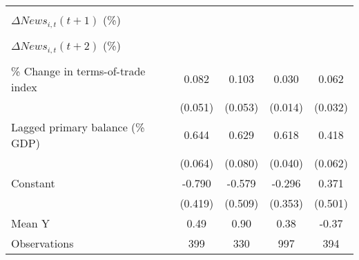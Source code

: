 {\begin{tabular}{l*{4}{c}}
                    &                     &                     &                     &                     \\
\addlinespace
$ \Delta News_{i,t}(t+1)$ (\%)&                     &                     &                     &                     \\
                    &                     &                     &                     &                     \\
\addlinespace
$ \Delta News_{i,t}(t+2)$ (\%)&                     &                     &                     &                     \\
                    &                     &                     &                     &                     \\
\addlinespace
\% Change in terms-of-trade index&       0.082         &       0.103\sym{*}  &       0.030\sym{**} &       0.062\sym{*}  \\
                    &     (0.051)         &     (0.053)         &     (0.014)         &     (0.032)         \\
\addlinespace
Lagged primary balance (\% GDP)&       0.644\sym{***}&       0.629\sym{***}&       0.618\sym{***}&       0.418\sym{***}\\
                    &     (0.064)         &     (0.080)         &     (0.040)         &     (0.062)         \\
\addlinespace
Constant            &      -0.790\sym{*}  &      -0.579         &      -0.296         &       0.371         \\
                    &     (0.419)         &     (0.509)         &     (0.353)         &     (0.501)         \\
\midrule
Mean Y              &        0.49         &        0.90         &        0.38         &       -0.37         \\
Observations        &         399         &         330         &         997         &         394         \\
\bottomrule
\end{tabular}
}
